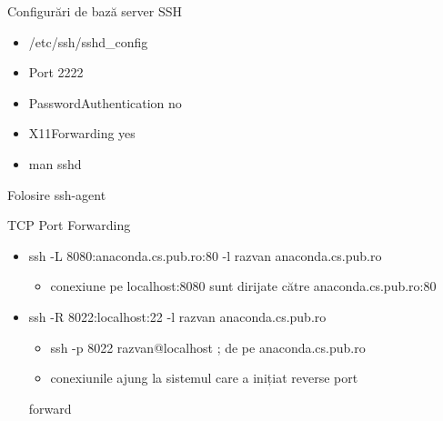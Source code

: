 \documentclass{beamer}
\begin{document}
\begin{frame}{Configurări de bază server SSH}
  \begin{itemize}
    \item /etc/ssh/sshd\_config
    \item Port 2222
    \item PasswordAuthentication no
    \item X11Forwarding yes
    \item man sshd
  \end{itemize}
\end{frame}

\begin{frame}{Folosire ssh-agent}
\end{frame}

\begin{frame}{TCP Port Forwarding}
  \begin{itemize}
    \item ssh -L 8080:anaconda.cs.pub.ro:80 -l razvan anaconda.cs.pub.ro
      \begin{itemize}
        \item conexiune pe localhost:8080 sunt dirijate către
anaconda.cs.pub.ro:80
      \end{itemize}
    \item ssh -R 8022:localhost:22 -l razvan anaconda.cs.pub.ro
       \begin{itemize}
         \item ssh -p 8022 razvan@localhost ; de pe anaconda.cs.pub.ro
         \item conexiunile ajung la sistemul care a inițiat reverse port
       \end{itemize}
forward
  \end{itemize}
\end{frame}
\end{document}
